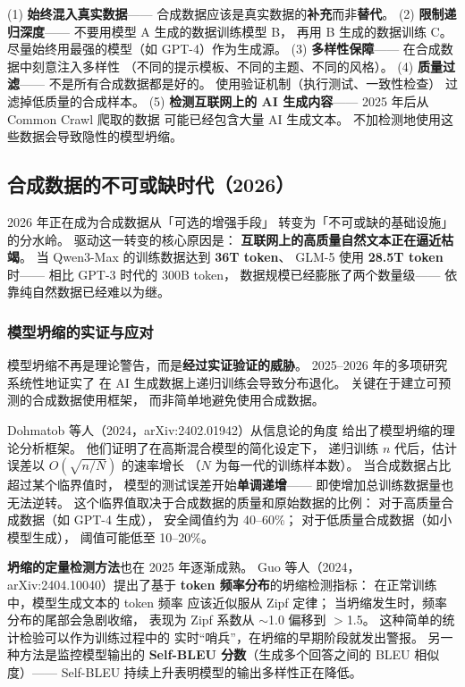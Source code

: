 \begin{warnbox}[避免模型坍缩的实践建议]
(1) \textbf{始终混入真实数据}——
合成数据应该是真实数据的\textbf{补充}而非\textbf{替代}。
(2) \textbf{限制递归深度}——
不要用模型 A 生成的数据训练模型 B，
再用 B 生成的数据训练 C。
尽量始终用最强的模型（如 GPT-4）作为生成源。
(3) \textbf{多样性保障}——
在合成数据中刻意注入多样性
（不同的提示模板、不同的主题、不同的风格）。
(4) \textbf{质量过滤}——
不是所有合成数据都是好的。
使用验证机制（执行测试、一致性检查）
过滤掉低质量的合成样本。
(5) \textbf{检测互联网上的 AI 生成内容}——
2025 年后从 Common Crawl 爬取的数据
可能已经包含大量 AI 生成文本。
不加检测地使用这些数据会导致隐性的模型坍缩。
\end{warnbox}

\subsection{合成数据的不可或缺时代（2026）}

2026 年正在成为合成数据从「可选的增强手段」
转变为「不可或缺的基础设施」的分水岭。
驱动这一转变的核心原因是：
\textbf{互联网上的高质量自然文本正在逼近枯竭}。
当 Qwen3-Max 的训练数据达到 \textbf{36T token}、
GLM-5 使用 \textbf{28.5T token} 时——
相比 GPT-3 时代的 300B token，
数据规模已经膨胀了两个数量级——
依靠纯自然数据已经难以为继。

\subsubsection{模型坍缩的实证与应对}

模型坍缩不再是理论警告，而是\textbf{经过实证验证的威胁}。
2025--2026 年的多项研究系统性地证实了
在 AI 生成数据上递归训练会导致分布退化。
关键在于建立可预测的合成数据使用框架，
而非简单地避免使用合成数据。

Dohmatob 等人（2024，arXiv:2402.01942）从信息论的角度
给出了模型坍缩的理论分析框架。
他们证明了在高斯混合模型的简化设定下，
递归训练 $n$ 代后，估计误差以
$O(\sqrt{n / N})$ 的速率增长
（$N$ 为每一代的训练样本数）。
当合成数据占比超过某个临界值时，
模型的测试误差开始\textbf{单调递增}——
即使增加总训练数据量也无法逆转。
这个临界值取决于合成数据的质量和原始数据的比例：
对于高质量合成数据（如 GPT-4 生成），
安全阈值约为 40--60\%；
对于低质量合成数据（如小模型生成），
阈值可能低至 10--20\%。

\textbf{坍缩的定量检测方法}也在 2025 年逐渐成熟。
Guo 等人（2024，arXiv:2404.10040）提出了基于
\textbf{token 频率分布}的坍缩检测指标：
在正常训练中，模型生成文本的 token 频率
应该近似服从 Zipf 定律；
当坍缩发生时，频率分布的尾部会急剧收缩，
表现为 Zipf 系数从 $\sim$1.0 偏移到 $>$1.5。
这种简单的统计检验可以作为训练过程中的
实时``哨兵''，在坍缩的早期阶段就发出警报。
另一种方法是监控模型输出的
\textbf{Self-BLEU 分数}（生成多个回答之间的 BLEU 相似度）——
Self-BLEU 持续上升表明模型的输出多样性正在降低。

